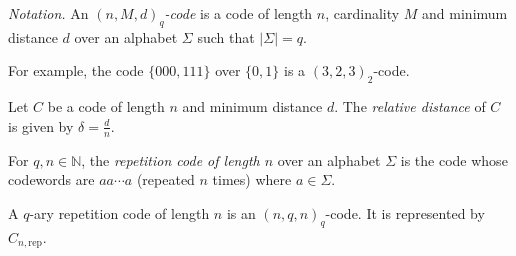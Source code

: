 \textit{Notation.} An \textit{$(n,M,d)_q$-code} is a code of length $n$, cardinality $M$ and minimum distance $d$ over an alphabet $\Sigma$ such that $|\Sigma|=q$.

For example, the code $\{000,111\}$ over $\{0,1\}$ is a $(3,2,3)_2$-code.

\begin{definition}
    Let $C$ be a code of length $n$ and minimum distance $d$. The \textit{relative distance} of $C$ is given by
    $\delta=\frac{d}{n}.$
\end{definition}

\begin{definition}
    For $q,n\in\mathbb{N}$, the \textit{repetition code of length $n$} over an alphabet $\Sigma$ is the code whose codewords are $aa\cdots a$ (repeated $n$ times) where $a\in\Sigma$.
\end{definition}

A $q$-ary repetition code of length $n$ is an $(n,q,n)_q$-code. It is represented by $C_{n,\text{rep}}$.

\clearpage